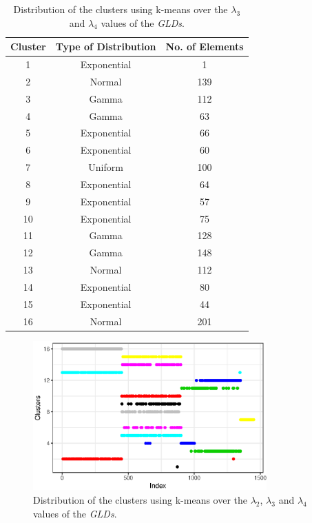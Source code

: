 \begin{table}[]
\centering
\caption{Distribution of the clusters using k-means over the $\lambda_{3}$ and $\lambda_{4}$ values of the \textit{GLDs}.}
\label{tab:dataset2_l3l4}
\begin{tabular}{|c|c|c|}
\hline
Cluster & Type of Distribution & No. of Elements \\ \hline
1       & Exponential          & 1              \\ \hline
2       & Normal          & 139              \\ \hline
3       & Gamma          & 112             \\ \hline
4       & Gamma               & 63              \\ \hline
5       & Exponential               & 66             \\ \hline
6       & Exponential              & 60            \\ \hline
7       & Uniform              & 100            \\ \hline
8       & Exponential          & 64              \\ \hline
9       & Exponential          & 57               \\ \hline
10      & Exponential               & 75              \\ \hline
11      & Gamma          & 128              \\ \hline
12       & Gamma              & 148             \\ \hline
13       & Normal          & 112              \\ \hline
14       & Exponential          & 80              \\ \hline
15      & Exponential               & 44              \\ \hline
16      & Normal          & 201              \\ \hline
\end{tabular}
\end{table}
 
 \begin{figure}[H]
    \centering
    \includegraphics[width=0.8\textwidth]{img/gld_clustering/datasetII/l3l4/normal_exponential_uniform3.eps}
    \caption{Distribution of the clusters using k-means over the $\lambda_{2}$, $\lambda_{3}$ and $\lambda_{4}$ values of the \textit{GLDs}.}
    \label{fig:dataset2_l3l4}
\end{figure}

